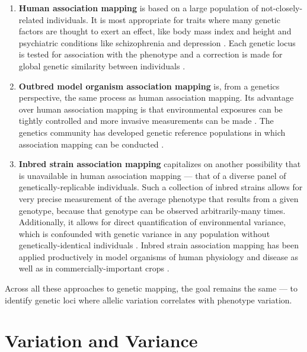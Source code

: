 \begin{enumerate}
	\item \textbf{Human association mapping} is based on a large population of not-closely-related individuals.
	It is most appropriate for traits where many genetic factors are thought to exert an effect, like body mass index \citep{Speliotes2010,Locke2015} and height \citep{Allen2010,Wood2014-fh} and psychiatric conditions like schizophrenia \citep{Ripke2014a} and depression \citep{PGC2017}.
	Each genetic locus is tested for association with the phenotype and a correction is made for global genetic similarity between individuals \citep{Lippert2011,Zhou2012}.
	\item \textbf{Outbred model organism association mapping} is, from a genetics perspective, the same process as human association mapping.
	Its advantage over human association mapping is that environmental exposures can be tightly controlled and more invasive measurements can be made \citep{Falconer1965,Lynch1998}.
	The genetics community has developed genetic reference populations in which association mapping can be conducted \citep{Ghazalpour2012b,Svenson2012a,Bogue2015}.
	\item \textbf{Inbred strain association mapping} capitalizes on another possibility that is unavailable in human association mapping --- that of a diverse panel of genetically-replicable individuals.
	Such a collection of inbred strains allows for very precise measurement of the average phenotype that results from a given genotype, because that genotype can be observed arbitrarily-many times.
	Additionally, it allows for direct quantification of environmental variance, which is confounded with genetic variance in any population without genetically-identical individuals \citep{Falconer1965,Lynch1998}.
	Inbred strain association mapping has been applied productively in model organisms of human physiology and disease \citep{TheComplexTraitConsortium2004,MacKay2012,King2012} as well as in commercially-important crops \citep{McMullen2009,Bandillo2013}.
\end{enumerate}

Across all these approaches to genetic mapping, the goal remains the same --- to identify genetic loci where allelic variation correlates with phenotype variation.

\section{Variation and Variance}

